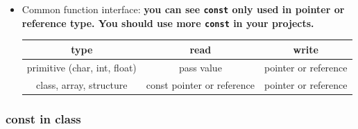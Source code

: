 \documentclass[a4paper,11pt,twoside]{book}
\newcommand{\tophline}{\hline }
\newcommand{\bottomhline}{\\ \hline }
\newcommand{\tophline}{ }
\newcommand{\bottomhline}{ }
\begin{document}
\begin{itemize}
	\item Common function interface: \textbf{you can see \texttt{const} only used in pointer or reference type. You should use more \texttt{const} in your projects. }
	
	\begin{tabular}{|c|c|c|}
		\tophline
		\textbf{type} & \textbf{read} & \textbf{write} \\ \tophline
		
		primitive (char, int, float) & pass value & pointer or reference \\ \tophline
		class, array, structure  & const pointer or reference &  pointer or reference \bottomhline
	\end{tabular}
\end{itemize}

\subsubsection{const in class}
\end{document}
